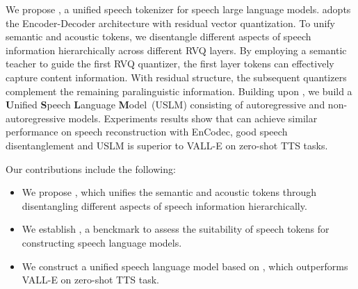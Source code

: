 We propose \method, a unified speech tokenizer for speech large language models. \method adopts the Encoder-Decoder architecture with residual vector quantization.
To unify semantic and acoustic tokens, we disentangle different aspects of speech information hierarchically across different RVQ layers.
By employing a semantic teacher to guide the first RVQ quantizer, the first layer tokens can effectively capture content information. With residual structure, the subsequent quantizers complement the remaining paralinguistic information. 
Building upon \method, we build a \textbf{U}nified \textbf{S}peech \textbf{L}anguage \textbf{M}odel~(USLM) consisting
of autoregressive and non-autoregressive models. Experiments results show that \method can achieve similar performance on speech reconstruction with EnCodec, good speech disentanglement and USLM is superior to VALL-E on zero-shot TTS tasks.



Our contributions include the following:
 \begin{itemize}[itemsep=1pt, leftmargin=10pt, parsep=0pt, topsep=1pt]
    \item 
    We propose \method, which unifies the semantic and acoustic tokens through disentangling different aspects of speech information hierarchically.




    \item 
    We establish \bench, a  benckmark to assess the suitability of speech tokens for constructing speech language models.

    
    \item 
    We construct a unified speech language model based on \method, which outperforms VALL-E on zero-shot TTS task.


    
    
\end{itemize}

